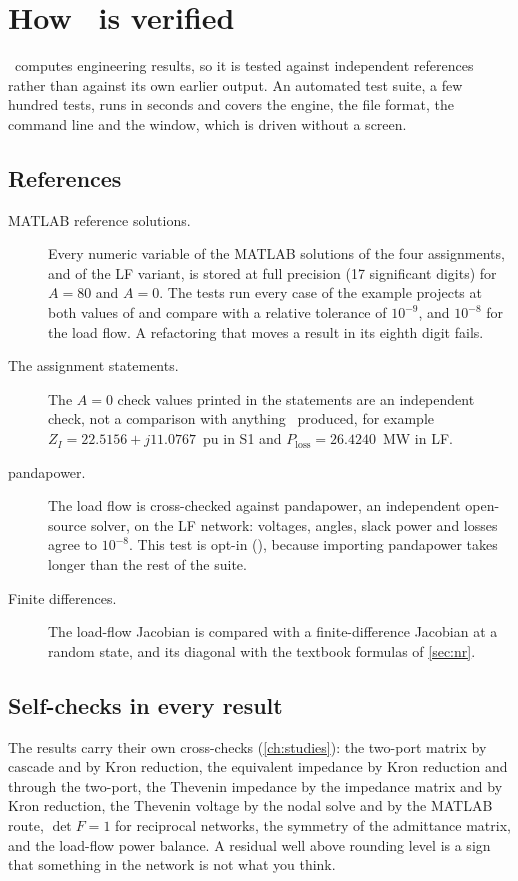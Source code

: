 \chapter{How \app\ is verified}\label{app:verification}

\app\ computes engineering results, so it is tested against independent references rather
than against its own earlier output. An automated test suite, a few hundred tests, runs
in seconds and covers the engine, the file format, the command line and the window, which
is driven without a screen.

\section{References}

\begin{description}
  \item[MATLAB reference solutions.] Every numeric variable of the MATLAB solutions of
    the four assignments, and of the LF variant, is stored at full precision (17
    significant digits) for $A = 80$ and $A = 0$. The tests run every case of the example
    projects at both values of  and compare with a relative tolerance of
    $10^{-9}$, and $10^{-8}$ for the load flow. A refactoring that moves a result in its
    eighth digit fails.
  \item[The assignment statements.] The $A = 0$ check values printed in the statements are
    an independent check, not a comparison with anything \app\ produced, for example
    $Z_I = 22.5156 + j11.0767$~pu in S1 and $P_\text{loss} = 26.4240$~MW in LF.
  \item[pandapower.] The load flow is cross-checked against pandapower, an independent
    open-source solver, on the LF network: voltages, angles, slack power and losses agree
    to $10^{-8}$. This test is opt-in (), because importing pandapower
    takes longer than the rest of the suite.
  \item[Finite differences.] The load-flow Jacobian is compared with a finite-difference
    Jacobian at a random state, and its diagonal with the textbook formulas of
    \cref{sec:nr}.
\end{description}

\section{Self-checks in every result}

The results carry their own cross-checks (\cref{ch:studies}): the two-port matrix by
cascade and by Kron reduction, the equivalent impedance by Kron reduction and through
the two-port, the Thevenin impedance by the impedance matrix and by Kron reduction, the
Thevenin voltage by the nodal solve and by the MATLAB route, $\det F = 1$ for reciprocal
networks, the symmetry of the admittance matrix, and the load-flow power balance. A
residual well above rounding level is a sign that something in the network is not what
you think.

